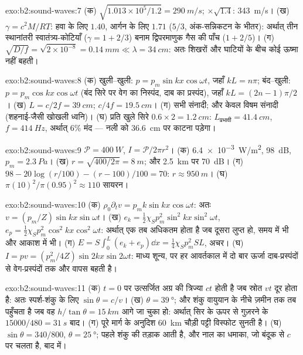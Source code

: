 \begin{solution}{exo:b2:sound-waves:7}
(क) $\sqrt{1.013 \times 10^5/1.2} = \qty{290}{m/s}$; $\times\sqrt{1.4}$: \qty{343}{m/s}। (ख)
$\gamma = c^2M/RT$: हवा के लिए $1.40$, आर्गन के लिए $1.71$ ($5/3$, अंक-सन्निकटन के भीतर):
अर्थात् तीन स्थानांतरी स्वातंत्र्य-कोटियाँ ($\gamma = 1 + 2/3$) बनाम द्विपरमाणुक गैस की
पाँच ($1 + 2/5$)। (ग) $\sqrt{D/f} = \sqrt{2 \times 10^{-8}} = \qty{0.14}{mm}
\ll \lambda = \qty{34}{cm}$: अतः शिखरों और घाटियों के बीच कोई ऊष्मा नहीं बहती।
\end{solution}

\begin{solution}{exo:b2:sound-waves:8}
(क) खुली--खुली: $p = p_m\sin kx\cos\omega t$, जहाँ $kL = n\pi$; बंद--खुली:
$p = p_m\cos kx\cos\omega t$ (बंद सिरे पर वेग का निस्पंद, दाब का प्रस्पंद),
जहाँ $kL = (2n - 1)\pi/2$। (ख) $L = c/2f = \qty{39}{cm}$; $c/4f = \qty{19.5}{cm}$।
(ग) सभी संनादी; और केवल विषम संनादी (शहनाई-जैसी खोखली ध्वनि)।
(घ) प्रति खुले सिरे $0.6 \times 2 = \qty{1.2}{cm}$: $L_{\text{प्रभावी}} = \qty{41.4}{cm}$, $f =
\qty{414}{Hz}$, अर्थात् $6\%$ मंद --- नली को \qty{36.6}{cm} पर काटना पड़ेगा।
\end{solution}

\begin{solution}{exo:b2:sound-waves:9}
$\mathcal P = \qty{400}{W}$, $I = \mathcal P/2\pi r^2$। (क) \qty{6.4e-3}{W/m^2}, \qty{98}{dB},
$p_m = \qty{2.3}{Pa}$। (ख) $r = \sqrt{400/2\pi} = \qty{8}{m}$; और \qty{2.5}{km} पर \qty{70}{dB}।
(ग) $98 - 20\log(r/100) - (r - 100)/100 = 70$: $r \approx \qty{950}{m}$। (घ)
$\pi(10)^2/\pi(0.95)^2 \approx 110$ सायरन।
\end{solution}

\begin{solution}{exo:b2:sound-waves:10}
(क) $\rho_0\partial_tv = p_mk\sin kx\cos\omega t$: अतः $v = (p_m/Z)\sin kx\sin\omega t$। (ख)
$e_k = \tfrac12\chi_Sp_m^2\sin^2kx\sin^2\omega t$, $e_p = \tfrac12\chi_Sp_m^2\cos^2kx\cos^2\omega t$:
अर्थात् एक तब अधिकतम होता है जब दूसरा लुप्त हो, समय में भी और आकाश में भी। (ग) $E =
S\int_0^L(e_k + e_p)\dd x = \tfrac14\chi_Sp_m^2SL$, अचर। (घ) $I = pv =
(p_m^2/4Z)\sin2kx\sin2\omega t$: माध्य शून्य, पर हर आवर्तकाल में दो बार ऊर्जा
दाब-प्रस्पंदों से वेग-प्रस्पंदों तक और वापस बहती है।
\end{solution}

\begin{solution}{exo:b2:sound-waves:11}
(क) $t = 0$ पर उत्सर्जित अग्र की त्रिज्या $ct$ होती है जब स्रोत $vt$
दूर होता है: अतः स्पर्श-शंकु के लिए $\sin\theta = c/v$। (ख) $\theta = \qty{39}{\degree}$; और शंकु
वायुयान के नीचे ज़मीन तक तब पहुँचता है जब वह $h/\tan\theta = \qty{15}{km}$
आगे जा चुका हो: अर्थात् सिर के ऊपर से गुज़रने के $15000/480 = \qty{31}{s}$ बाद। (ग) पूरे
मार्ग के अनुदिश \qty{60}{km} चौड़ी पट्टी विस्फोट सुनती है। (घ) $\sin\theta
= 340/800$, $\theta = \qty{25}{\degree}$; पहले शंकु की तड़ाक आती है, और
नाल का धमाका, जो बंदूक से $c$ पर चलता है, बाद में।
\end{solution}

